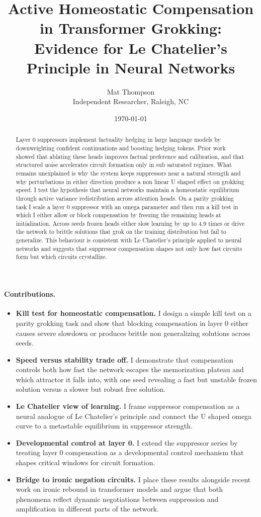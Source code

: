 \documentclass[11pt]{article}
\title{Active Homeostatic Compensation in Transformer Grokking:\\Evidence for Le Chatelier's Principle in Neural Networks}
\author{Mat Thompson\\Independent Researcher, Raleigh, NC}
\date{\today}
\begin{document}
\maketitle

\begin{abstract}
Layer 0 suppressors implement factuality hedging in large language models by downweighting confident continuations and boosting hedging tokens. Prior work showed that ablating these heads improves factual preference and calibration, and that structured noise accelerates circuit formation only in sub saturated regimes. What remains unexplained is why the system keeps suppressors near a natural strength and why perturbations in either direction produce a non linear U shaped effect on grokking speed. I test the hypothesis that neural networks maintain a homeostatic equilibrium through active variance redistribution across attention heads. On a parity grokking task I scale a layer 0 suppressor with an omega parameter and then run a kill test in which I either allow or block compensation by freezing the remaining heads at initialization. Across seeds frozen heads either slow learning by up to 4.9 times or drive the network to brittle solutions that grok on the training distribution but fail to generalize. This behaviour is consistent with Le Chatelier's principle applied to neural networks and suggests that suppressor compensation shapes not only how fast circuits form but which circuits crystallize.
\end{abstract}

\paragraph{Contributions.}
\begin{itemize}
  \item \textbf{Kill test for homeostatic compensation.} I design a simple kill test on a parity grokking task and show that blocking compensation in layer 0 either causes severe slowdown or produces brittle non generalizing solutions across seeds.
  \item \textbf{Speed versus stability trade off.} I demonstrate that compensation controls both how fast the network escapes the memorization plateau and which attractor it falls into, with one seed revealing a fast but unstable frozen solution versus a slower but robust free solution.
  \item \textbf{Le Chatelier view of learning.} I frame suppressor compensation as a neural analogue of Le Chatelier's principle and connect the U shaped omega curve to a metastable equilibrium in suppressor strength.
  \item \textbf{Developmental control at layer 0.} I extend the suppressor series by treating layer 0 compensation as a developmental control mechanism that shapes critical windows for circuit formation.
  \item \textbf{Bridge to ironic negation circuits.} I place these results alongside recent work on ironic rebound in transformer models and argue that both phenomena reflect dynamic negotiations between suppression and amplification in different parts of the network.
\end{itemize}











\end{document}
